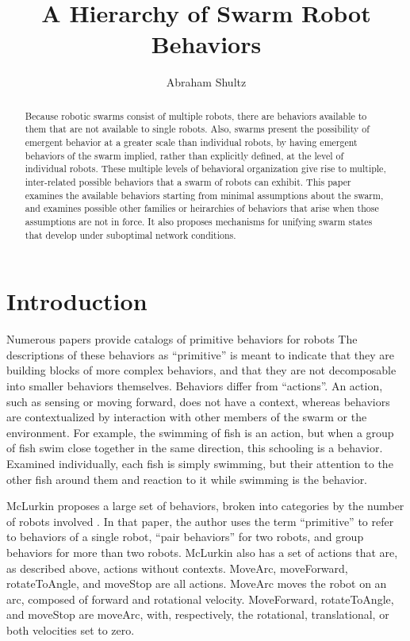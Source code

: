 \documentclass[]{article}
\title{A Hierarchy of Swarm Robot Behaviors}
\author{Abraham Shultz}
\begin{document}
\maketitle

\begin{abstract}
Because robotic swarms consist of multiple robots, there are behaviors available to them that are not available to single robots. Also, swarms present the possibility of emergent behavior at a greater scale than individual robots, by having emergent behaviors of the swarm implied, rather than explicitly defined, at the level of individual robots. These multiple levels of behavioral organization give rise to multiple, inter-related possible behaviors that a swarm of robots can exhibit. This paper examines the available behaviors starting from minimal assumptions about the swarm, and examines possible other families or heirarchies of behaviors that arise when those assumptions are not in force. It also proposes mechanisms for unifying swarm states that develop under suboptimal network conditions. 

\end{abstract}

\section{Introduction}

Numerous papers provide catalogs of primitive behaviors for robots 
The descriptions of these behaviors as ``primitive'' is meant to indicate that they are building blocks of more complex behaviors, and that they are not decomposable into smaller behaviors themselves. 
Behaviors differ from ``actions''. 
An action, such as sensing or moving forward, does not have a context, whereas behaviors are contextualized by interaction with other members of the swarm or the environment.
For example, the swimming of fish is an action, but when a group of fish swim close together in the same direction, this schooling is a behavior. 
Examined individually, each fish is simply swimming, but their attention to the other fish around them and reaction to it while swimming is the behavior. 
 
McLurkin proposes a large set of behaviors, broken into categories by the number of robots involved \cite{mclurkin2004stupid}. 
In that paper, the author uses the term ``primitive'' to refer to behaviors of a single robot, ``pair behaviors'' for two robots, and group behaviors for more than two robots. 
McLurkin also has a set of actions that are, as described above, actions without contexts. 
MoveArc, moveForward, rotateToAngle, and moveStop are all actions. 
MoveArc moves the robot on an arc, composed of forward and rotational velocity. MoveForward, rotateToAngle, and moveStop are moveArc, with, respectively, the rotational, translational, or both velocities set to zero. 
\end{document}
